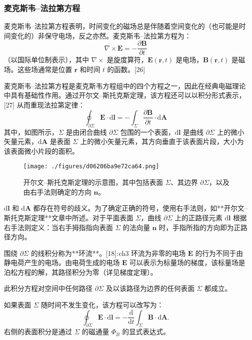 \subsubsection{麦克斯韦–法拉第方程}
麦克斯韦–法拉第方程表明，时间变化的磁场总是伴随着空间变化的（也可能是时间变化的）非保守电场，反之亦然。麦克斯韦–法拉第方程为：
\[
\nabla \times \mathbf{E} = -\frac{\partial \mathbf{B}}{\partial t}~
\]
（以国际单位制表示），其中 \( \nabla \times \) 是旋度算符，\( \mathbf{E}(\mathbf{r}, t) \) 是电场，\( \mathbf{B}(\mathbf{r}, t) \) 是磁场。这些场通常是位置 \( \mathbf{r} \) 和时间 \( t \) 的函数。[26]

麦克斯韦–法拉第方程是麦克斯韦方程组中的四个方程之一，因此在经典电磁理论中具有基础性作用。通过开尔文–斯托克斯定理，该方程还可以以积分形式表示，[27] 从而重现法拉第定律：
\[
\oint_{\partial \Sigma} \mathbf{E} \cdot \mathrm{d} \mathbf{l} = -\int_{\Sigma} \frac{\partial \mathbf{B}}{\partial t} \cdot \mathrm{d} \mathbf{A}~
\]
其中，如图所示，\( \Sigma \) 是由闭合曲线 \( \partial \Sigma \) 包围的一个表面，\( \mathrm{d}\mathbf{l} \) 是曲线 \( \partial \Sigma \) 上的微小矢量元素，\( \mathrm{d}\mathbf{A} \) 是表面 \( \Sigma \) 上的微小矢量元素，其方向垂直于该表面片段，大小为该表面微小片段的面积。
\begin{figure}[ht]
\centering
\texttt{[image: ./figures/d06206ba9e72ca64.png]}
\caption{开尔文–斯托克斯定理的示意图，其中包括表面 \( \Sigma \)、其边界 \( \partial \Sigma \)，以及由右手法则确定的方向 \( \mathbf{n} \)。} \label{fig_FLDL_8}
\end{figure}
\(\mathrm{d}\mathbf{l}\) 和 \(\mathrm{d}\mathbf{A}\) 都存在符号的歧义。为了确定正确的符号，使用右手法则，如**开尔文–斯托克斯定理**文章中所述。对于平面表面 \(\Sigma\)，曲线 \(\partial \Sigma\) 上的正路径元素 \(\mathrm{d}\mathbf{l}\) 根据右手法则定义：当右手拇指指向表面 \(\Sigma\) 的法向量 \(\mathbf{n}\) 时，手指所指的方向即为正路径方向。

围绕 \(\partial \Sigma\) 的线积分称为**环流**。[18]: ch3 环流为非零的电场 \(\mathbf{E}\) 的行为不同于由静电荷产生的电场。由电荷生成的电场 \(\mathbf{E}\) 可以表示为标量场的梯度，该标量场是泊松方程的解，其路径积分为零（详见梯度定理）。

此积分方程对空间中任何路径 \(\partial \Sigma\) 及以该路径为边界的任何表面 \(\Sigma\) 都成立。

如果表面 \(\Sigma\) 随时间不发生变化，该方程可以改写为：
\[
\oint_{\partial \Sigma} \mathbf{E} \cdot \mathrm{d}\mathbf{l} = -\frac{\mathrm{d}}{\mathrm{d}t} \int_{\Sigma} \mathbf{B} \cdot \mathrm{d}\mathbf{A}.~
\]
右侧的表面积分是通过 \(\Sigma\) 的磁通量 \(\Phi_B\) 的显式表达式。

